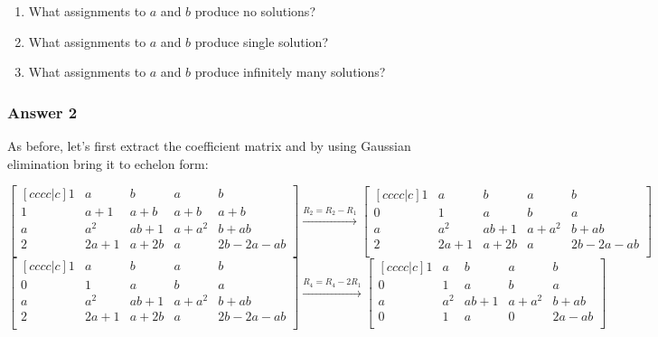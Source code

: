 \documentclass[11pt]{article}
\begin{document}
\begin{enumerate}
\item What assignments to $a$ and $b$ produce no solutions?
\item What assignments to $a$ and $b$ produce single solution?
\item What assignments to $a$ and $b$ produce infinitely many solutions?
\end{enumerate}

\subsubsection{Answer 2}
\label{sec-1-2-1}
As before, let's first extract the coefficient matrix and by using
Gaussian elimination bring it to echelon form:

\begin{equation*}
  \begin{bmatrix}[cccc|c]
    1 & a    & b    & a     & b \\
    1 & a+1  & a+b  & a+b   & a+b \\
    a & a^2  & ab+1 & a+a^2 & b+ab \\
    2 & 2a+1 & a+2b & a     & 2b-2a-ab \\
  \end{bmatrix}
  \xrightarrow{R_2 = R_2 - R_1}
  \begin{bmatrix}[cccc|c]
    1 & a    & b    & a     & b \\
    0 & 1    & a    & b     & a \\
    a & a^2  & ab+1 & a+a^2 & b+ab \\
    2 & 2a+1 & a+2b & a     & 2b-2a-ab \\
  \end{bmatrix}
\end{equation*}
\begin{equation*}
  \begin{bmatrix}[cccc|c]
    1 & a    & b    & a     & b \\
    0 & 1    & a    & b     & a \\
    a & a^2  & ab+1 & a+a^2 & b+ab \\
    2 & 2a+1 & a+2b & a     & 2b-2a-ab \\
  \end{bmatrix}
  \xrightarrow{R_4 = R_4 - 2R_1}
  \begin{bmatrix}[cccc|c]
    1 & a   & b    & a     & b \\
    0 & 1   & a    & b     & a \\
    a & a^2 & ab+1 & a+a^2 & b+ab \\
    0 & 1   & a    & 0     & 2a-ab \\
  \end{bmatrix}
\end{equation*}
\end{document}
